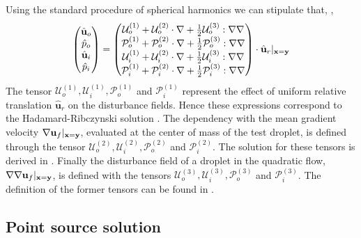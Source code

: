 Using the standard procedure of spherical harmonics we can stipulate that, \citep{leal2007advanced,raja2010inertial,nadim1991motion},
\begin{align*}
    \begin{pmatrix}
        \hat{\textbf{u}}_{o}\\
        \hat{p}_{o}\\
        \hat{\textbf{u}}_{i}\\
        \hat{p}_{i}
    \end{pmatrix}
    =
    \begin{pmatrix}
        \mathcal{U}_{o}^{(1)} + \mathcal{U}_{o}^{(2)}\cdot \mathbf{\nabla} + \frac{1}{2}\mathcal{U}_{o}^{(3)} :\mathbf{\nabla}\mathbf{\nabla} \\
        \mathcal{P}_{o}^{(1)} + \mathcal{P}_{o}^{(2)}\cdot \mathbf{\nabla} + \frac{1}{2}\mathcal{P}_{o}^{(3)} :\mathbf{\nabla}\mathbf{\nabla} \\
        \mathcal{U}_{i}^{(1)} + \mathcal{U}_{i}^{(2)}\cdot \mathbf{\nabla} + \frac{1}{2}\mathcal{U}_{i}^{(3)} :\mathbf{\nabla}\mathbf{\nabla} \\
        \mathcal{P}_{i}^{(1)} + \mathcal{P}_{i}^{(2)}\cdot \mathbf{\nabla} + \frac{1}{2}\mathcal{P}_{i}^{(3)} :\mathbf{\nabla}\mathbf{\nabla} \\
    \end{pmatrix}
    \cdot 
    \hat{\textbf{u}}_r|_{\textbf{x}=\textbf{y}}
\end{align*}
The tensor $\mathcal{U}_{o}^{(1)},\mathcal{U}_{i}^{(1)},\mathcal{P}_{o}^{(1)}$  and $\mathcal{P}_{i}^{(1)}$ represent the effect of uniform relative translation $\hat{\textbf{u}}_r$ on the disturbance fields.
Hence these expressions correspond to the Hadamard-Ribczynski solution \citep{pozrikidis1992boundary,kim2013microhydrodynamics}. 
The dependency with the mean gradient velocity $\mathbf{\nabla} \textbf{u}_f|_{\textbf{x}=\textbf{y}}$, evaluated at the center of mass of the test droplet, is defined through the tensor $\mathcal{U}_{o}^{(2)},\mathcal{U}_{i}^{(2)},\mathcal{P}_{o}^{(2)}$ and $\mathcal{P}_{i}^{(2)}$.
The solution for these tensors is derived in \citet{rallison1978note,leal2007advanced,raja2010inertial}. 
Finally the disturbance field of a droplet in the quadratic flow, $\mathbf{\nabla}\mathbf{\nabla} \textbf{u}_f|_{\textbf{x}=\textbf{y}}$, is defined with the tensors $\mathcal{U}_{o}^{(3)},\mathcal{U}_{i}^{(3)},\mathcal{P}_{o}^{(3)}$ and $\mathcal{P}_{i}^{(3)}$.
The definition of the former tensors can be found in \citet{nadim1991motion}.


\subsection{Point source solution}



